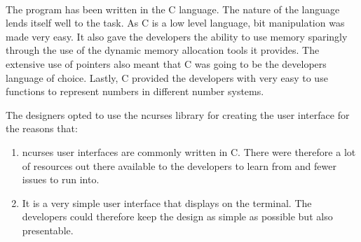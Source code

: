 \documentclass[letterpaper, 11pt, twoside]{article}
\begin{document}
\paragraph{}
\begin{flushleft}
The program has been written in the C language. The nature of the language lends itself well to the task. As C is a low level language, bit manipulation was made very easy. It also gave the developers the ability to use memory sparingly through the use of the dynamic memory allocation tools it provides. The extensive use of pointers also meant that C was going to be the developers language of choice. Lastly, C provided the developers with very easy to use functions to represent numbers in different number systems.


The designers opted to use the ncurses library for creating the user interface for the reasons that:
 \begin{enumerate}
  \item ncurses user interfaces are commonly written in C. There were therefore a lot of resources out there available to the developers to learn from and fewer issues to run into.
  \item It is a very simple user interface that displays on the terminal. The developers could therefore keep the design as simple as possible but also presentable.
\end{enumerate}
\end{flushleft}


\end{document}
